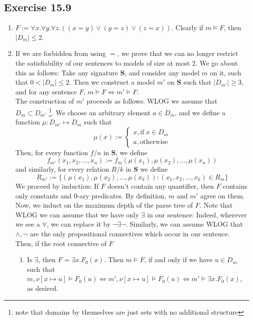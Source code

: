 \documentclass{article}
\begin{document}
\subsection*{Exercise 15.9}
\begin{enumerate}[label=(\alph*)]
    \item $F := \forall x.\forall y.\forall z. ((x = y)\lor (y = z)\lor (z = x))$. Clearly if $m\models F$, then $|D_m|\leq 2$.
    \item If we are forbidden from using $=$, we prove that we can no longer restrict the satisfiability of our sentences to models of size at most 2. We go about this as follows: Take any signature $\mathbf{S}$, and consider any model $m$ on it, such that $0 < |D_m|\leq 2$. Then we construct a model $m'$ on $\mathbf{S}$ such that $|D_{m'}|\geq 3$, and for any sentence $F$, $m\models F\Longleftrightarrow m'\models F$.\\
    The construction of $m'$ proceeds as follows: WLOG we assume that $D_{m}\subset D_{m'}$ \footnote{note that domains by themselves are just sets with no additional structure}. We choose an arbitrary element $a\in D_m$, and we define a function $\mu: D_{m'}\mapsto D_m$ such that 
    $$\mu(x) := 
    \begin{cases}
        x, \text{if}\; x\in D_m\\
        a, \text{otherwise}
    \end{cases}$$
    Then, for every function $f/n$ in $\mathbf{S}$, we define 
    $$f_{m'}(x_1, x_2, \ldots, x_n) := f_{m}(\mu(x_1), \mu(x_2), \ldots, \mu(x_n))$$
    and similarly, for every relation $R/k$ in $\mathbf{S}$ we define
    $$R_{m'} := \{(\mu(x_1), \mu(x_2), \ldots, \mu(x_k)): (x_1, x_2, \ldots, x_k)\in R_m\} $$
    We proceed by induction: If $F$ doesn't contain any quantifier, then $F$ contains only constants and $0$-ary predicates. By definition, $m$ and $m'$ agree on them. Now, we induct on the maximum depth of the parse tree of $F$. Note that WLOG we can assume that we have only $\exists$ in our sentence: Indeed, wherever we see a $\forall$, we can replace it by $\lnot\exists\lnot$. Similarly, we can assume WLOG that $\wedge, \lnot$ are the only propositional connectives which occur in our sentence. Then, if the root connective of $F$
    \begin{enumerate}
        \item Is $\exists$, then $F = \exists x. F_0(x)$. Then $m\models F$, if and only if we have $u\in D_m$ such that $m, \nu[x\mapsto u]\models F_0(u)\Longleftrightarrow m', \nu[x\mapsto u]\models F_0(u)\Longleftrightarrow m'\models\exists x. F_0(x)$, as desired.

\end{enumerate}
\end{enumerate}
\end{document}
